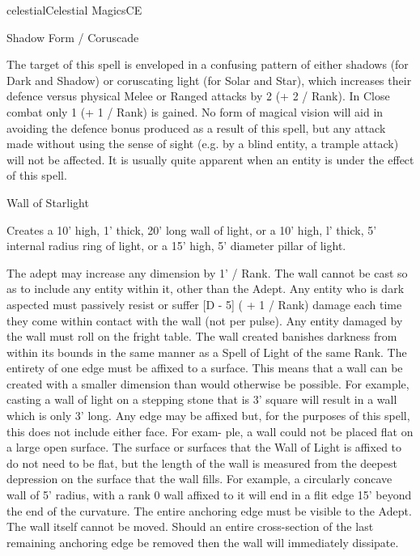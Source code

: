 \begin{College}[1.3]{celestial}{Celestial Magics}{CE}
\begin{spell}[G-4]{Shadow Form / Coruscade}

\begin{effects}
The target of this spell is enveloped in a confusing pattern of either
shadows (for Dark and Shadow) or coruscating light (for Solar and
Star), which increases their defence versus physical Melee or Ranged
attacks by 2 (+ 2 / Rank).  In Close combat only 1 (+ 1 / Rank) is
gained.  No form of magical vision will aid in avoiding the defence
bonus produced as a result of this spell, but any attack made without
using the sense of sight (e.g. by a blind entity, a trample attack)
will not be affected. It is usually quite apparent when an entity is
under the effect of this spell.
\end{effects}
\end{spell}


\begin{spell}[G-5]{Wall of Starlight }

\begin{effects}
Creates a 10’ high, 1’ thick, 20’ long wall of light, or a 10’ high,
l’ thick, 5’ internal radius ring of light, or a 15’ high, 5’ diameter
pillar of light.

The adept may increase any dimension by 1’ / Rank. The wall cannot be
cast so as to include any entity within it, other than the Adept.  Any
entity who is dark aspected must passively resist or suffer [D - 5] (
+ 1 / Rank) damage each time they come within contact with the wall
(not per pulse).  Any entity damaged by the wall must roll on the
fright table.  The wall created banishes darkness from within its
bounds in the same manner as a Spell of Light of the same Rank.  The
entirety of one edge must be affixed to a surface. This means that a
wall can be created with a smaller dimension than would otherwise be
possible. For example, casting a wall of light on a stepping stone
that is 3’ square will result in a wall which is only 3’ long.  Any
edge may be affixed but, for the purposes of this spell, this does not
include either face.  For exam- ple, a wall could not be placed flat
on a large open surface.  The surface or surfaces that the Wall of
Light is affixed to do not need to be flat, but the length of the wall
is measured from the deepest depression on the surface that the wall
fills.  For example, a circularly concave wall of 5’ radius, with a
rank 0 wall affixed to it will end in a flit edge 15’ beyond the end
of the curvature.  The entire anchoring edge must be visible to the
Adept.  The wall itself cannot be moved.  Should an entire
cross-section of the last remaining anchoring edge be removed then the
wall will immediately dissipate.


\end{effects}
\end{spell}
\end{College}
